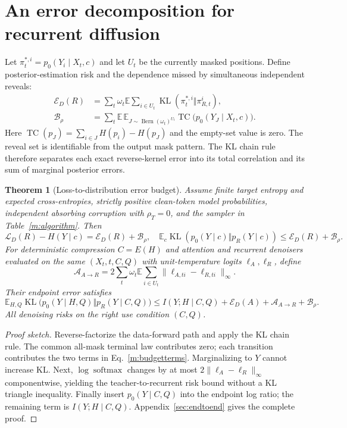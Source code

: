 \documentclass{article}
\newtheorem{theorem}{Theorem}[section]
\theoremstyle{remark}\newtheorem{remark}[theorem]{Remark}
\newcommand{\E}{\mathbb E}
\newcommand{\KL}{\operatorname{KL}}
\begin{document}
\section{An error decomposition for recurrent diffusion}
\label{m:theory}
Let $\pi_t^{*,i}=p_0(Y_i\mid X_t,c)$ and let $U_t$ be the currently masked positions. Define posterior-estimation risk and the dependence missed by simultaneous independent reveals:
\begin{align}
\mathcal E_D(R)&=\sum_t\omega_t\E\sum_{i\in U_t}\KL(\pi_t^{*,i}\Vert\pi_{R,t}^i),\\
\mathcal B_\rho&=\sum_t\E\,\E_{J\sim\operatorname{Bern}(\omega_t)^{U_t}}
\operatorname{TC}\bigl(p_0(Y_J\mid X_t,c)\bigr).
\label{m:budgetterms}
\end{align}
Here $\operatorname{TC}(p_J)=\sum_{i\in J}H(p_i)-H(p_J)$ and the empty-set value is zero. The reveal set is identifiable from the output mask pattern. The KL chain rule therefore separates each exact reverse-kernel error into its total correlation and its sum of marginal posterior errors.

\begin{theorem}[Loss-to-distribution error budget]
\label{m:thm}
Assume finite target entropy and expected cross-entropies, strictly positive clean-token model probabilities, independent absorbing corruption with $\rho_T=0$, and the sampler in Table~\ref{m:algorithm}. Then
\begin{equation}
\mathcal L_D(R)-H(Y\mid c)=\mathcal E_D(R)+\mathcal B_\rho,
\quad
\E_c\KL(p_0(Y\mid c)\Vert p_R(Y\mid c))\le\mathcal E_D(R)+\mathcal B_\rho.
\label{m:path}
\end{equation}
For deterministic compression $C=E(H)$ and attention and recurrent denoisers evaluated on the same $(X_t,t,C,Q)$ with unit-temperature logits $\ell_A,\ell_R$, define
\begin{equation}
\mathcal A_{A\to R}=2\sum_t\omega_t\E\sum_{i\in U_t}\|\ell_{A,ti}-\ell_{R,ti}\|_\infty.
\end{equation}
Their endpoint error satisfies
\begin{equation}
\boxed{\E_{H,Q}\KL\bigl(p_0(Y\mid H,Q)\Vert p_R(Y\mid C,Q)\bigr)
\le I(Y;H\mid C,Q)+\mathcal E_D(A)+\mathcal A_{A\to R}+\mathcal B_\rho.}
\label{m:master}
\end{equation}
All denoising risks on the right use condition $(C,Q)$.
\end{theorem}
\begin{proof}[Proof sketch]
Reverse-factorize the data-forward path and apply the KL chain rule. The common all-mask terminal law contributes zero; each transition contributes the two terms in Eq.~\eqref{m:budgetterms}. Marginalizing to $Y$ cannot increase KL. Next, $\log\operatorname{softmax}$ changes by at most $2\|\ell_A-\ell_R\|_\infty$ componentwise, yielding the teacher-to-recurrent risk bound without a KL triangle inequality. Finally insert $p_0(Y\mid C,Q)$ into the endpoint log ratio; the remaining term is $I(Y;H\mid C,Q)$. Appendix~\ref{sec:endtoend} gives the complete proof.
\end{proof}
\end{document}
